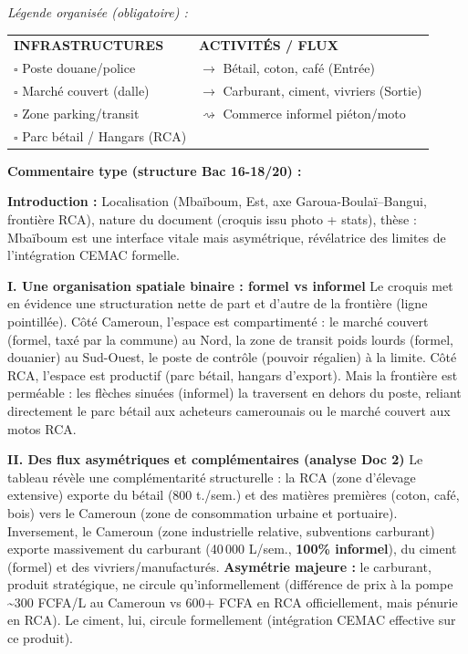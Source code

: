 \documentclass[11pt]{article}
\begin{document}
\begin{exoresolu}
\textit{Légende organisée (obligatoire) :}
\begin{center}
\begin{tabular}{ll}
\textbf{INFRASTRUCTURES} & \textbf{ACTIVITÉS / FLUX} \\
\textcolor{popblue}{$\square$} Poste douane/police & \textcolor{poporange}{\textbf{$\rightarrow$}} Bétail, coton, café (Entrée) \\
\textcolor{popgreen}{$\square$} Marché couvert (dalle) & \textcolor{popblue}{\textbf{$\rightarrow$}} Carburant, ciment, vivriers (Sortie) \\
\textcolor{poporange}{$\square$} Zone parking/transit & \textcolor{poppink}{\textbf{$\rightsquigarrow$}} Commerce informel piéton/moto \\
\textcolor{poppurple}{$\square$} Parc bétail / Hangars (RCA) & \\
\end{tabular}
\end{center}

\textbf{Commentaire type (structure Bac 16-18/20) :}

\textbf{Introduction :} Localisation (Mbaïboum, Est, axe Garoua-Boulaï–Bangui, frontière RCA), nature du document (croquis issu photo + stats), thèse : Mbaïboum est une interface vitale mais asymétrique, révélatrice des limites de l'intégration CEMAC formelle.

\textbf{I. Une organisation spatiale binaire : formel vs informel}
Le croquis met en évidence une structuration nette de part et d'autre de la frontière (ligne pointillée). Côté Cameroun, l'espace est compartimenté : le marché couvert (formel, taxé par la commune) au Nord, la zone de transit poids lourds (formel, douanier) au Sud-Ouest, le poste de contrôle (pouvoir régalien) à la limite. Côté RCA, l'espace est productif (parc bétail, hangars d'export). Mais la frontière est perméable : les flèches sinuées (informel) la traversent en dehors du poste, reliant directement le parc bétail aux acheteurs camerounais ou le marché couvert aux motos RCA.

\textbf{II. Des flux asymétriques et complémentaires (analyse Doc 2)}
Le tableau révèle une complémentarité structurelle : la RCA (zone d'élevage extensive) exporte du bétail (800 t./sem.) et des matières premières (coton, café, bois) vers le Cameroun (zone de consommation urbaine et portuaire). Inversement, le Cameroun (zone industrielle relative, subventions carburant) exporte massivement du carburant (40\,000 L/sem., \textbf{100\% informel}), du ciment (formel) et des vivriers/manufacturés. \textbf{Asymétrie majeure :} le carburant, produit stratégique, ne circule qu'informellement (différence de prix à la pompe \textasciitilde 300 FCFA/L au Cameroun vs 600+ FCFA en RCA officiellement, mais pénurie en RCA). Le ciment, lui, circule formellement (intégration CEMAC effective sur ce produit).


\end{exoresolu}
\end{document}

